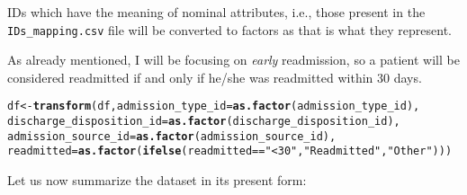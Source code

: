 \documentclass{article}\usepackage[]{graphicx}\usepackage[]{color}
\makeatletter
\newcommand{\hlstr}[1]{\textcolor[rgb]{0.192,0.494,0.8}{#1}}%
\newcommand{\hlopt}[1]{\textcolor[rgb]{0,0,0}{#1}}%
\newcommand{\hlstd}[1]{\textcolor[rgb]{0.345,0.345,0.345}{#1}}%
\newcommand{\hlkwb}[1]{\textcolor[rgb]{0.69,0.353,0.396}{#1}}%
\newcommand{\hlkwc}[1]{\textcolor[rgb]{0.333,0.667,0.333}{#1}}%
\newcommand{\hlkwd}[1]{\textcolor[rgb]{0.737,0.353,0.396}{\textbf{#1}}}%
\newenvironment{kframe}{%
 \def\at@end@of@kframe{}%
 \ifinner\ifhmode%
  \def\at@end@of@kframe{\end{minipage}}%
  \begin{minipage}{\columnwidth}%
 \fi\fi%
 \def\FrameCommand##1{\hskip\@totalleftmargin \hskip-\fboxsep
 \colorbox{shadecolor}{##1}\hskip-\fboxsep
     \hskip-\linewidth \hskip-\@totalleftmargin \hskip\columnwidth}%
 \MakeFramed {\advance\hsize-\width
   \@totalleftmargin\z@ \linewidth\hsize
   \@setminipage}}%
 {\par\unskip\endMakeFramed%
 \at@end@of@kframe}
\newenvironment{knitrout}{}{} %
\makeatother
\begin{document}
IDs which have the meaning of nominal attributes, i.e., those present in the
\texttt{IDs\_mapping.csv} file will be converted to factors as that is what they
represent.

As already mentioned, I will be focusing on \emph{early} readmission, so a
patient will be considered readmitted if and only if he/she was readmitted
within \num{30} days.

\begin{knitrout}
\color{fgcolor}\begin{kframe}
\begin{alltt}
\hlstd{df} \hlkwb{<-} \hlkwd{transform}\hlstd{(df,} \hlkwc{admission_type_id}\hlstd{=}\hlkwd{as.factor}\hlstd{(admission_type_id),}
                \hlkwc{discharge_disposition_id}\hlstd{=}\hlkwd{as.factor}\hlstd{(discharge_disposition_id),}
                \hlkwc{admission_source_id}\hlstd{=}\hlkwd{as.factor}\hlstd{(admission_source_id),}
                \hlkwc{readmitted}\hlstd{=}\hlkwd{as.factor}\hlstd{(}\hlkwd{ifelse}\hlstd{(readmitted} \hlopt{==} \hlstr{"<30"}\hlstd{,} \hlstr{"Readmitted"}\hlstd{,} \hlstr{"Other"}\hlstd{)))}
\end{alltt}
\end{kframe}
\end{knitrout}

Let us now summarize the dataset in its present form:
\end{document}
